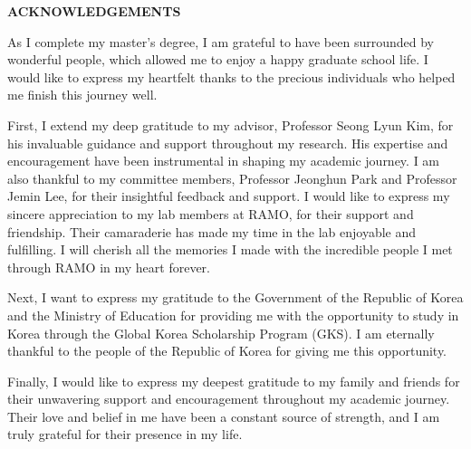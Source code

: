 \clearpage
{}
\begin{centering}
\textbf{ACKNOWLEDGEMENTS}\\
\vspace{\baselineskip}
\end{centering}

As I complete my master’s degree, I am grateful to have been surrounded by wonderful people, which allowed me to enjoy a happy graduate school life. I would like to express my heartfelt thanks to the precious individuals who helped me finish this journey well.

First, I extend my deep gratitude to my advisor, Professor Seong Lyun Kim, for his invaluable guidance and support throughout my research. His expertise and encouragement have been instrumental in shaping my academic journey. 
I am also thankful to my committee members, Professor Jeonghun Park and Professor Jemin Lee, for their insightful feedback and support.
I would like to express my sincere appreciation to my lab members at RAMO, for their support and friendship. Their camaraderie has made my time in the lab enjoyable and fulfilling. I will cherish all the memories I made with the incredible people I met through RAMO in my heart forever.

Next, I want to express my gratitude to the Government of the Republic of Korea and the Ministry of Education for providing me with the opportunity to study in Korea through the Global Korea Scholarship Program (GKS). I am eternally thankful to the people of the Republic of Korea for giving me this opportunity. 

Finally, I would like to express my deepest gratitude to my family and friends for their unwavering support and encouragement throughout my academic journey. Their love and belief in me have been a constant source of strength, and I am truly grateful for their presence in my life.

\thispagestyle{empty}
\clearpage
